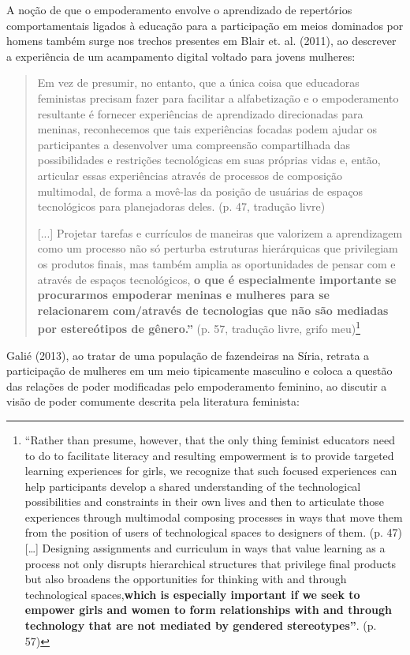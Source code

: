 A noção de que o empoderamento envolve o aprendizado de repertórios comportamentais ligados à educação para a participação em meios dominados por homens também surge nos trechos presentes em Blair et. al. (2011), ao descrever a experiência de um acampamento digital voltado para jovens mulheres:

\begin{quote}
    Em vez de presumir, no entanto, que a única coisa que educadoras feministas precisam fazer para facilitar a alfabetização e o empoderamento resultante é fornecer experiências de aprendizado direcionadas para meninas, reconhecemos que tais experiências focadas podem ajudar os participantes a desenvolver uma compreensão compartilhada das possibilidades e restrições tecnológicas em suas próprias vidas e, então, articular essas experiências através de processos de composição multimodal, de forma a movê-las da posição de usuárias de espaços tecnológicos para planejadoras deles. (p. 47, tradução livre) 

    [...] Projetar tarefas e currículos de maneiras que valorizem a aprendizagem como um processo não só perturba estruturas hierárquicas que privilegiam os produtos finais, mas também amplia as oportunidades de pensar com e através de espaços tecnológicos, \textbf{o que é especialmente importante se procurarmos empoderar meninas e mulheres para se relacionarem com/através de tecnologias que não são mediadas por estereótipos de gênero.”} (p. 57, tradução livre, grifo meu)\footnote{“Rather than presume, however, that the only thing feminist educators need to do to facilitate literacy and resulting empowerment is to provide targeted learning experiences for girls, we recognize that such focused experiences can help participants develop a shared understanding of the technological possibilities and constraints in their own lives and then to articulate those experiences through multimodal composing processes in ways that move them from the position of users of technological spaces to designers of them. (p. 47) […] Designing assignments and curriculum in ways that value learning as a process not only disrupts hierarchical structures that privilege final products but also broadens the opportunities for thinking with and through technological spaces,\textbf{which is especially important if we seek to empower girls and women to form relationships with and through technology that are not mediated by gendered stereotypes”}. (p. 57)}
\end{quote}

Galié (2013), ao tratar de uma população de fazendeiras na Síria, retrata a participação de mulheres em um meio tipicamente masculino e coloca a questão das relações de poder modificadas pelo empoderamento feminino, ao discutir a visão de poder comumente descrita pela literatura feminista:

